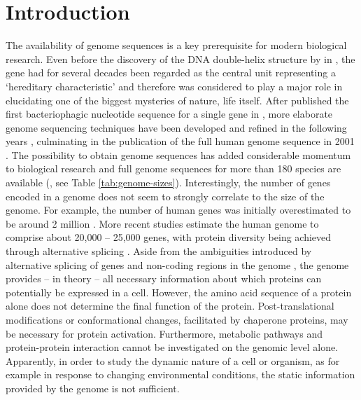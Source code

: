\cleardoublepage
\chapter{Introduction}

The availability of genome sequences is a key prerequisite for modern 
biological research.
Even before the discovery of the DNA double-helix structure by 
\citeauthor{Watson1953} in \citeyear{Watson1953}, the gene had for several 
decades been regarded as the central unit representing a 
`hereditary characteristic' \citep{Vries1889} and therefore was considered
to play a major role in elucidating one of the biggest mysteries of nature, 
life itself.
After \citeauthor{Jou1972} published the first bacteriophagic nucleotide 
sequence for a single gene in \citeyear{Jou1972}, more elaborate genome 
sequencing techniques have been developed and refined in the following years
\citep{Gilbert1973, Sanger1975, Maxam1977}, culminating in the publication of 
the full human genome sequence in 2001 \citep{Venter2001}.
The possibility to obtain genome sequences has added considerable momentum
to biological research and full genome sequences for more than 180 species
are available (\cite{Yates2009}, see Table \ref{tab:genome-sizes}).
Interestingly, the number of genes encoded in a genome does not seem to strongly
correlate to the size of the genome.
For example, the number of human genes was initially overestimated to be around 
2 million \citep{Kauffman1969}.
More recent studies estimate the human genome to comprise about 20,000 -- 25,000 
genes, with protein diversity being achieved through alternative splicing 
\citep{Rubin2004}.
Aside from the ambiguities introduced by alternative splicing of genes 
\citep{Black2003} and non-coding regions in the genome \citep{Gilbert1978},
the genome provides -- in theory -- all necessary information about which 
proteins can potentially be expressed in a cell.
However, the amino acid sequence of a protein alone does not determine the 
final function of the protein.
Post-translational modifications or conformational changes, facilitated by
chaperone proteins, may be necessary for protein activation.
Furthermore, metabolic pathways and protein-protein interaction cannot be
investigated on the genomic level alone.
Apparently, in order to study the dynamic nature of a cell or organism, as for 
example in response to changing environmental conditions, the static information
provided by the genome is not sufficient. 

